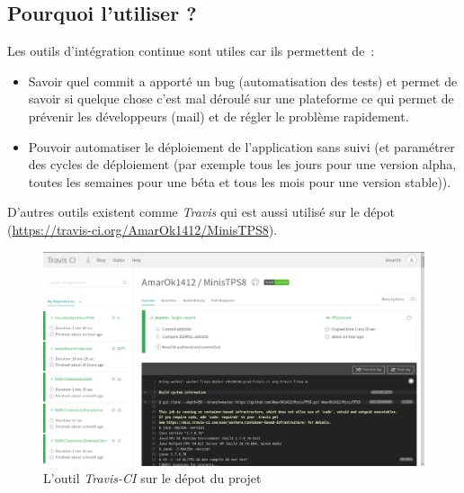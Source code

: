 \documentclass{article}
\begin{document}
\subsection{Pourquoi l'utiliser ?}
Les outils d'intégration continue sont utiles car ils permettent de~:
\begin{itemize}
	\item Savoir quel commit a apporté un bug (automatisation des tests) et permet de savoir si quelque chose c'est mal déroulé sur une plateforme ce qui permet de prévenir les développeurs (mail) et de régler le problème rapidement.
	\item Pouvoir automatiser le déploiement de l'application sans suivi (et paramétrer des cycles de déploiement (par exemple tous les jours pour une version alpha, toutes les semaines pour une béta et tous les mois pour une version stable)).
\end{itemize}
D'autres outils existent comme \emph{Travis} qui est aussi utilisé sur le dépot (\url{https://travis-ci.org/AmarOk1412/MinisTPS8}).
\begin{figure}
	\begin{center}
		\includegraphics[scale=0.3]{img/travis}
		\caption{L'outil \emph{Travis-CI} sur le dépot du projet}
		\label{fig:Travis}
	\end{center}
\end{figure}
\end{document}
